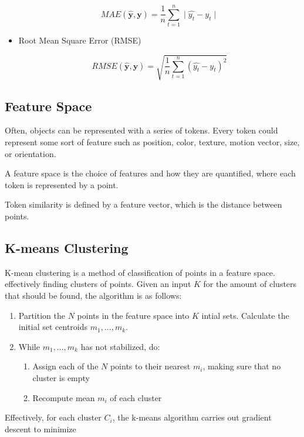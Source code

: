 \documentclass{article}
\begin{document}
\begin{multicols}{2}
\begin{itemize}
$$
MAE(\mathbf{\hat y}, \mathbf{y}) = \frac{1}{n}\sum_{t=1}^n \mid \hat{y_t} - y_t \mid
$$

\item Root Mean Square Error (RMSE)

$$
RMSE(\mathbf{\hat y}, \mathbf{y}) = \sqrt{\frac{1}{n}\sum_{t=1}^n (\hat{y_t} - y_t)^2}
$$

\end{itemize}

\subsection{Feature Space}

Often, objects can be represented with a series of tokens. Every token could represent some sort of feature such as position, color, texture, motion vector, size, or orientation.

A feature space is the choice of features and how they are quantified, where each token is represented by a point.

Token similarity is defined by a feature vector, which is the distance between points.

\subsection{K-means Clustering}

K-mean clustering is a method of classification of points in a feature space. effectively finding clusters of points. Given an input $K$ for the amount of clusters that should be found, the algorithm is as follows:

\begin{enumerate}
\item Partition the $N$ points in the feature space into $K$ intial sets. Calculate the initial set centroids $m_1, ..., m_k$.

\item While $m_1, ..., m_k$ has not stabilized, do:
\begin{enumerate}
\item {Assign each of the $N$ points to their nearest $m_i$, making sure that no cluster is empty}
\item {Recompute mean $m_i$ of each cluster}
\end{enumerate}
\end{enumerate}

Effectively, for each cluster $C_i$, the k-means algorithm carries out gradient descent to minimize


\end{multicols}
\end{document}
